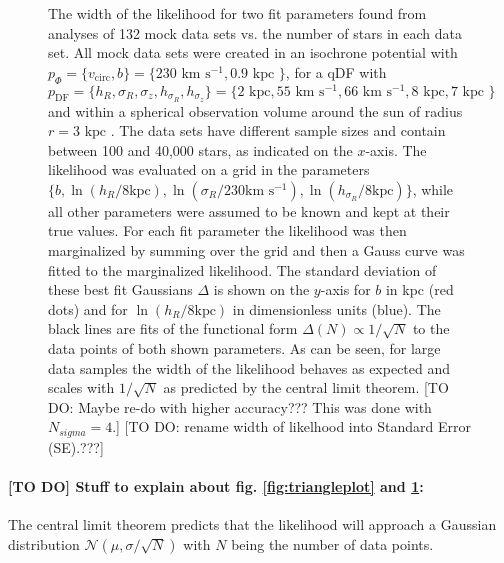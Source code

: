 \begin{figure}
\caption{The width of the likelihood for two fit parameters found from analyses of 132 mock data sets vs. the number of stars in each data set. All mock data sets were created in an isochrone potential with $p_\Phi = \{v_\text{circ},b \}=\{230 \text{ km s$^{-1}$},0.9\text{ kpc } \}$, for a qDF with $p_\text{DF} = \{ h_R, \sigma_R, \sigma_z,h_{\sigma_R},h_{\sigma_z}\} =\{2 \text{ kpc}, 55 \text{ km s$^{-1}$}, 66 \text{ km s$^{-1}$}, 8 \text{ kpc}, 7 \text{ kpc }\} $ and within a spherical observation volume around the sun of radius $r = 3 \text{ kpc }$. The data sets have different sample sizes and contain between 100 and 40,000 stars, as indicated on the $x$-axis. The likelihood was evaluated on a grid in the parameters $\{b,\ln(h_R/8\text{kpc}),\ln(\sigma_{R}/230 \text{km s$^{-1}$}),\ln(h_{\sigma_R}/8\text{kpc}) \}$, while all other parameters were assumed to be known and kept at their true values. For each fit parameter the likelihood was then marginalized by summing over the grid and then a Gauss curve was fitted to the marginalized likelihood. The standard deviation of these best fit Gaussians $\Delta$ is shown on the $y$-axis for $b$ in kpc (red dots) and for $\ln(h_R/8\text{kpc})$ in dimensionless units (blue). The black lines are fits of the functional form $\Delta(N) \propto 1/\sqrt{N}$ to the data points  of both shown parameters. As can be seen, for large data samples the width of the likelihood behaves as expected and scales with $1/\sqrt{N}$ as predicted by the central limit theorem.  [TO DO: Maybe re-do with higher accuracy??? This was done with $N_{sigma} = 4$.] [TO DO: rename width of likelhood into Standard Error (SE).???]} 
\label{fig:sqrtN}
\end{figure}

\paragraph{[TO DO] Stuff to explain about fig. \ref{fig:triangleplot} and \ref{fig:sqrtN}:} The central limit theorem predicts that the likelihood will approach a Gaussian distribution $\mathscr{N}(\mu,\sigma/\sqrt{N})$ with $N$ being the number of data points.




